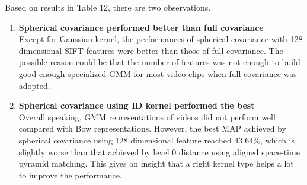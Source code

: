\noindent Based on results in Table 12, there are two observations. 
\begin{enumerate}
  \item{\bf Spherical covariance performed better than full covariance}\\
  Except for Gaussian kernel, the performances of spherical covariance with 128 dimensional SIFT features were better than those of full covariance. The possible reason could be that the number of features was not enough to build good enough specialized GMM for most video clips when full covariance was adopted. 

  \item{\bf Spherical covariance using ID kernel performed the best}\\
  Overall speaking, GMM representations of videos did not perform well compared with Bow representations. However, the best MAP achieved by spherical covariance using 128 dimensional feature reached $43.64 \%$, which is slightly worse than that achieved by level 0 distance using aligned space-time pyramid matching. This gives an insight that a right kernel type helps a lot to improve the performance. 
\end{enumerate}



